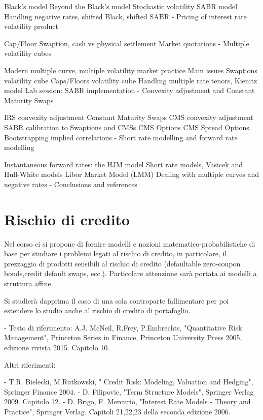 Black's model
Beyond the Black's model
Stochastic volatility SABR model
Handling negative rates, shifted Black, shifted SABR
- Pricing of interest rate volatility product

Cap/Floor
Swaption, cash vs physical settlement
Market quotations
- Multiple volatility cubes

Modern multiple curve, multiple volatility market practice
Main issues
Swaptions volatility cube
Caps/Floors volatility cube
Handling multiple rate tenors, Kienitz model
Lab session: SABR implementation
- Convexity adjustment and Constant Maturity Swaps

IRS convexity adjustment
Constant Maturity Swaps
CMS convexity adjustment
SABR calibration to Swaptions and CMSs
CMS Options
CMS Spread Options
Bootstrapping implied correlations
- Short rate modelling and forward rate modelling

Instantaneous forward rates: the HJM model
Short rate models, Vasicek and Hull-White models
Libor Market Model (LMM)
Dealing with multiple curves and negative rates
- Conclusions and references



\section{Rischio di credito}
Nel corso ci si propone di fornire modelli e nozioni matematico-probabilistiche di base per studiare i problemi legati al rischio di credito, in particolare, il prezzaggio di prodotti sensibili al rischio di credito (defaultable zero-coupon bonds,credit default swaps, ecc.). Particolare attenzione sarà portata ai modelli a struttura affine.

Si studierà dapprima il caso di una sola controparte fallimentare per poi estendere lo studio anche al rischio di credito di portafoglio.

- Testo di riferimento: A.J. McNeil, R.Frey, P.Embrechts, "Quantitative Risk Management", Princeton Series in Finance, Princeton University Press 2005, edizione rivista 2015. Capitolo 10.



Altri riferimenti:

- T.R. Bielecki, M.Rutkowski, " Credit Risk: Modeling, Valuation and Hedging", Springer Finance 2004.
- D. Filipovic, "Term Structure Models", Springer Verlag 2009. Capitolo 12.
- D. Brigo, F. Mercurio, "Interest Rate Models - Theory and Practice", Springer Verlag. Capitoli 21,22,23 della seconda edizione 2006.


